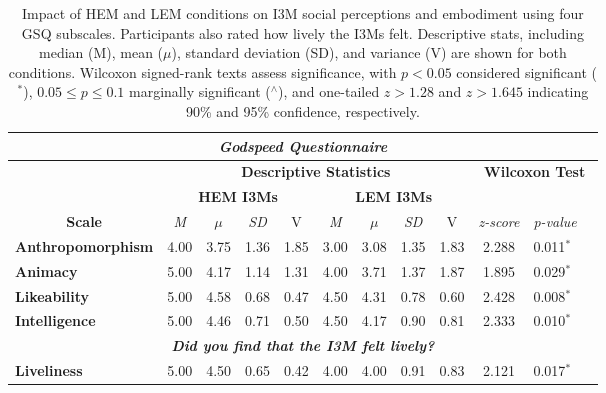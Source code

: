 \begin{table*}[b!]
\caption{Impact of HEM and LEM conditions on I3M social perceptions and embodiment using four GSQ subscales. Participants also rated how lively the I3Ms felt. Descriptive stats, including median (M), mean ($\mu$), standard deviation (SD), and variance (V) are shown for both conditions. Wilcoxon signed-rank texts assess significance, with $p < 0.05$ considered significant ($^\ast$), $0.05 \leq p \leq 0.1$ marginally significant ($^\wedge$), and one-tailed $z > 1.28$ and $z > 1.645$ indicating 90\% and 95\% confidence, respectively.}
\label{table:1}
\centering
\begin{tabular}{@{}cccccccccccclll@{}}
\toprule
\multicolumn{15}{c}{\textit{\textbf{Godspeed Questionnaire}}} \\ \midrule
\multicolumn{1}{c|}{\multirow{2}{*}{}} &
  \multicolumn{8}{c|}{\textbf{Descriptive Statistics}} &
  \multicolumn{6}{c}{\textbf{Wilcoxon Test}} \\
\multicolumn{1}{c|}{} &
  \multicolumn{4}{c|}{\textbf{HEM I3Ms}} &
  \multicolumn{4}{c|}{\textbf{LEM I3Ms}} &
  \multicolumn{6}{c}{} \\
\multicolumn{1}{c|}{\textbf{Scale}} &
 \textit{M} &
  $\mu$ &
 \textit{SD} &
  \multicolumn{1}{c|}{V} &
 \textit{M} &
  $\mu$ &
 \textit{SD} &
  \multicolumn{1}{c|}{V} &
 \textit{z-score} &
 \textit{p-value} &
  \multicolumn{4}{c}{} \\ \midrule
\multicolumn{1}{l|}{\textbf{Anthropomorphism}} &
  4.00 &
  3.75 &
  1.36 &
  \multicolumn{1}{c|}{1.85} &
  3.00 &
  3.08 &
  1.35 &
  \multicolumn{1}{c|}{1.83} &
  2.288 &
  \multicolumn{1}{l}{0.011$^\ast$} &
  \multicolumn{4}{c}{} \\
\multicolumn{1}{l|}{\textbf{Animacy}} &
  5.00 &
  4.17 &
  1.14 &
  \multicolumn{1}{c|}{1.31} &
  4.00 &
  3.71 &
  1.37 &
  \multicolumn{1}{c|}{1.87} &
  1.895 &
  \multicolumn{1}{l}{0.029$^\ast$} &
  \multicolumn{4}{c}{} \\
\multicolumn{1}{l|}{\textbf{Likeability}} &
  5.00 &
  4.58 &
  0.68 &
  \multicolumn{1}{c|}{0.47} &
  4.50 &
  4.31 &
  0.78 &
  \multicolumn{1}{c|}{0.60} &
  2.428 &
  \multicolumn{1}{l}{0.008$^\ast$} &
  \multicolumn{4}{c}{} \\
\multicolumn{1}{l|}{\textbf{Intelligence}} &
  5.00 &
  4.46 &
  0.71 &
  \multicolumn{1}{c|}{0.50} &
  4.50 &
  4.17 &
  0.90 &
  \multicolumn{1}{c|}{0.81} &
  2.333 &
  \multicolumn{1}{l}{0.010$^\ast$} &
  \multicolumn{4}{c}{} \\ \midrule
\multicolumn{15}{c}{\textit{\textbf{Did you find that the I3M felt lively?}}} \\ \midrule
\multicolumn{1}{l|}{\textbf{Liveliness}} &
  5.00 &
  4.50 &
  0.65 &
  \multicolumn{1}{c|}{0.42} &
  4.00 &
  4.00 &
  0.91 &
  \multicolumn{1}{c|}{0.83} &
  2.121 &
  \multicolumn{1}{l}{0.017$^\ast$} &
  \multicolumn{4}{c}{} \\ \bottomrule
\end{tabular}
\end{table*}